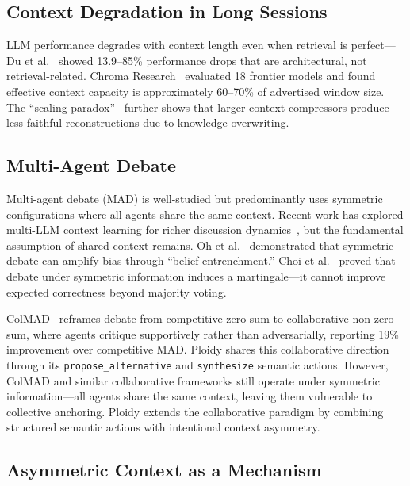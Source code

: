 \documentclass[11pt]{article}
\begin{document}
\subsection{Context Degradation in Long Sessions}
\label{sec:context-degradation}

LLM performance degrades with context length even when retrieval is perfect---Du et al.~\citep{du2025context} showed 13.9--85\% performance drops that are architectural, not retrieval-related. Chroma Research~\citep{chroma2025contextrot} evaluated 18 frontier models and found effective context capacity is approximately 60--70\% of advertised window size. The ``scaling paradox''~\citep{scaling2026paradox} further shows that larger context compressors produce less faithful reconstructions due to knowledge overwriting.

\subsection{Multi-Agent Debate}
\label{sec:mad}

Multi-agent debate (MAD) is well-studied but predominantly uses symmetric configurations where all agents share the same context. Recent work has explored multi-LLM context learning for richer discussion dynamics~\citep{m2cl2026}, but the fundamental assumption of shared context remains. Oh et al.~\citep{oh2025dreamad} demonstrated that symmetric debate can amplify bias through ``belief entrenchment.'' Choi et al.~\citep{choi2025debate} proved that debate under symmetric information induces a martingale---it cannot improve expected correctness beyond majority voting.

ColMAD~\citep{chen2025colmad} reframes debate from competitive zero-sum to collaborative non-zero-sum, where agents critique supportively rather than adversarially, reporting 19\% improvement over competitive MAD. Ploidy shares this collaborative direction through its \texttt{propose\_alternative} and \texttt{synthesize} semantic actions. However, ColMAD and similar collaborative frameworks still operate under symmetric information---all agents share the same context, leaving them vulnerable to collective anchoring. Ploidy extends the collaborative paradigm by combining structured semantic actions with intentional context asymmetry.

\subsection{Asymmetric Context as a Mechanism}
\label{sec:asymmetric}
\end{document}
